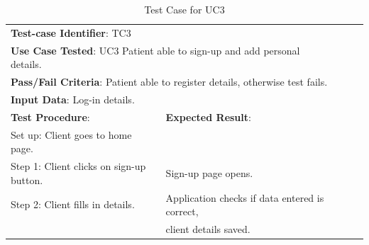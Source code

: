 \documentclass[a4paper]{article}
\begin{document}
\begin{table}[h!]
\centering
\caption*{Test Case for UC3}
\label{TC3}
\begin{tabular}{lllll}
\cline{1-2}

\multicolumn{2}{|l|}{\textbf{Test-case Identifier}: TC3}  &  &  &  \\

\multicolumn{2}{|l|}{\textbf{Use Case Tested}: UC3 Patient able to sign-up and add personal details.}  &  &  &  \\

\multicolumn{2}{|l|}{\textbf{Pass/Fail Criteria}: Patient able to register details, otherwise test fails.}  &  &  &  \\

\multicolumn{2}{|l|}{\textbf{Input Data}: Log-in details.}  &  &  &  \\

\cline{1-2}

\multicolumn{1}{|l|}{\textbf{Test Procedure}:} & \multicolumn{1}{l|}{\textbf{Expected Result}:} &  &  &  \\ 

\cline{1-2}

\multicolumn{1}{|l|}{Set up: Client goes to home page.} & \multicolumn{1}{l|}{} &  &  &  \\

\multicolumn{1}{|l|}{Step 1: Client clicks on sign-up button.} & \multicolumn{1}{l|}{Sign-up page opens.} &  &  &  \\

\multicolumn{1}{|l|}{Step 2: Client fills in details.} & \multicolumn{1}{l|}{Application checks if data entered is correct,} &  &  &  \\

\multicolumn{1}{|l|}{} & \multicolumn{1}{l|}{client details saved.} &  &  &  \\

\cline{1-2}

\end{tabular}
\end{table}

\FloatBarrier
\end{document}
